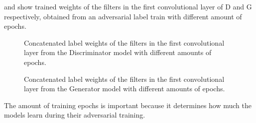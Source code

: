 \FloatBarrier
\noindent
{} and  show trained weights of the filters in the first convolutional layer of D and G respectively, obtained from an adversarial label train with different amount of epochs.
\begin{figure}[!ht]
  \centering
  \caption{Concatenated label weights of the filters in the first convolutional layer from the Discriminator model with different amounts of epochs.}
  \label{fig:nn_adv_label_weights_d}
\end{figure}
\FloatBarrier
\noindent
\begin{figure}[!ht]
  \centering
  \caption{Concatenated label weights of the filters in the first convolutional layer from the Generator model with different amounts of epochs.}
  \label{fig:nn_adv_label_weights_g}
\end{figure}
\FloatBarrier
\noindent
The amount of training epochs is important because it determines how much the models learn during their adversarial training.
